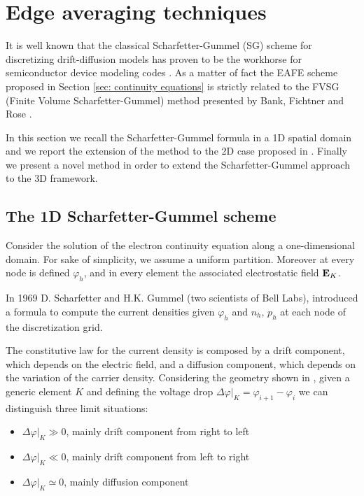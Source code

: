 %
%
%
%

 
 
\section{Edge averaging techniques} 
 
It is well known that the classical Scharfetter-Gummel (SG) scheme for discretizing drift-diffusion models has proven to be the workhorse for semiconductor device modeling codes \cite{Gummel:SignAnalys}. As a matter of fact the EAFE scheme proposed in Section \ref{sec: continuity equations} is strictly related to the FVSG (Finite Volume Scharfetter-Gummel) method presented by Bank, Fichtner and Rose \cite{Bank:FVSG}. 

In this section we recall the Scharfetter-Gummel formula in a 1D spatial domain and we report the extension of the method to the 2D case proposed in \cite{Bank:FEvsBOX}. Finally we present a novel method in order to extend the Scharfetter-Gummel approach to the 3D framework.

\subsection{The 1D Scharfetter-Gummel scheme}

Consider the solution of the electron continuity equation along a one-dimensional domain. For sake of simplicity, we assume a uniform partition. Moreover at every node is defined $\varphi_h$, and in every element the associated electrostatic field $\mathbf{E}_K$.

 In 1969 D. Scharfetter and H.K. Gummel (two scientists of Bell Labs), introduced a formula to compute the current densities given $\varphi_h$ and $n_h$, $p_h$ at each node of the discretization grid. 
 
The constitutive law for the current density is composed by a drift component, which depends on the electric field, and a diffusion component, which depends on the variation of the carrier density. Considering the geometry shown in , given a generic element $K$ and defining the voltage drop $\Delta \varphi|_K=\varphi_{i+1}-\varphi_{i}$ we can distinguish three limit situations: 
\begin{itemize}
\item $\Delta \varphi|_K \gg0$, mainly drift component from right to left 
\item $\Delta \varphi|_K \ll0$, mainly drift component from left to right
\item $\Delta \varphi|_K \simeq 0$, mainly diffusion component
\end{itemize} 
 
